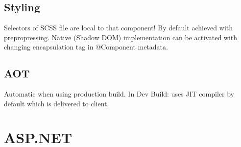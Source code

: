 \begin{multicols*}{2}
\subsection{Styling}
Selectors of SCSS file are local to that component! By default achieved with prepropressing. Native (Shadow DOM) implementation can be activated with changing encapsulation tag in @Component metadata.

\subsection{AOT}
Automatic when using production build. In Dev Build: uses JIT compiler by default which is delivered to client.

\section{ASP.NET}

\end{multicols*}
